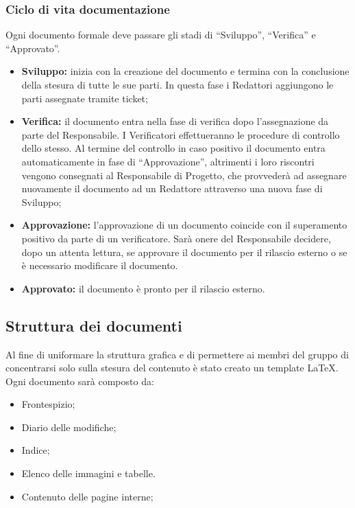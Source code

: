 \subsubsection{Ciclo di vita documentazione}
Ogni documento formale deve passare gli stadi di ``Sviluppo”, ``Verifica” e ``Approvato”.
\begin{itemize}
	\item \textbf{Sviluppo:} inizia con la creazione del documento e termina con la conclusione	della stesura di tutte le sue parti. In questa fase i Redattori aggiungono le parti assegnate tramite ticket;
	
	\item  \textbf{Verifica:} il documento entra nella fase di verifica dopo l’assegnazione da
	parte del Responsabile. I Verificatori effettueranno le procedure di controllo
	dello stesso.
	Al termine del controllo in caso positivo il documento entra automaticamente
	in fase di ``Approvazione”, altrimenti i loro riscontri vengono consegnati
	al Responsabile di Progetto, che provvederà ad assegnare nuovamente il
	documento ad un Redattore attraverso una nuova fase di Sviluppo;
	
	\item  \textbf{Approvazione:} l’approvazione di un documento coincide con il superamento
	positivo da parte di un verificatore. 
	Sarà onere del Responsabile decidere, dopo un attenta lettura, se approvare il documento per il rilascio esterno o se è necessario modificare il documento.

	
	\item  \textbf{Approvato:} il documento è pronto per il rilascio esterno.
\end{itemize}


\subsection{Struttura dei documenti}
Al fine di uniformare la struttura grafica e di permettere ai membri del gruppo di concentrarsi solo sulla stesura del contenuto è stato creato un template \LaTeX.
Ogni documento sarà composto da:
\begin{itemize}
	\item Frontespizio;
	\item Diario delle modifiche;
	\item Indice;
	\item Elenco delle immagini e tabelle.
	\item Contenuto delle pagine interne;
\end{itemize}
